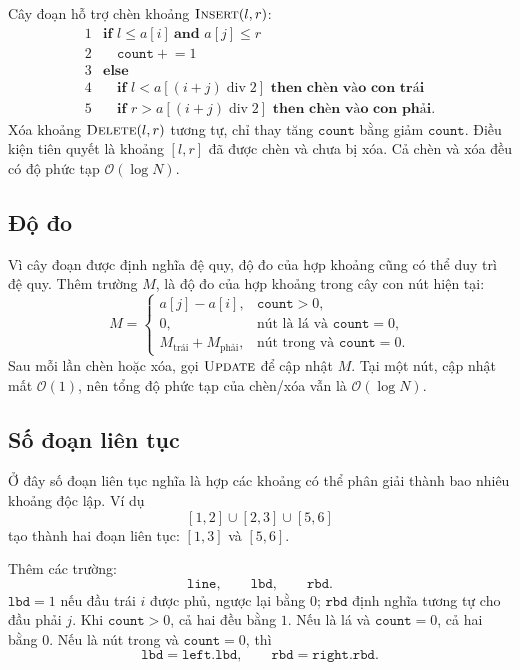 \documentclass[11pt]{article}
\newcommand{\Oh}{\mathcal{O}}
\begin{document}
Cây đoạn hỗ trợ chèn khoảng \(\textsc{Insert}(l,r)\):
\[
\begin{array}{ll}
1 & \textbf{if } l\le a[i]\ \textbf{and } a[j]\le r\\
2 & \quad \texttt{count}\mathrel{+}=1\\
3 & \textbf{else}\\
4 & \quad \textbf{if } l<a[(i+j)\operatorname{div}2] \textbf{ then chèn vào con trái}\\
5 & \quad \textbf{if } r>a[(i+j)\operatorname{div}2] \textbf{ then chèn vào con phải}.
\end{array}
\]
Xóa khoảng \(\textsc{Delete}(l,r)\) tương tự, chỉ thay tăng
\(\texttt{count}\) bằng giảm \(\texttt{count}\). Điều kiện tiên quyết là khoảng
\([l,r]\) đã được chèn và chưa bị xóa. Cả chèn và xóa đều có độ phức tạp
\(\Oh(\log N)\).

\subsection{Độ đo}

Vì cây đoạn được định nghĩa đệ quy, độ đo của hợp khoảng cũng có thể duy trì
đệ quy. Thêm trường \(M\), là độ đo của hợp khoảng trong cây con nút hiện tại:
\[
M=
\begin{cases}
a[j]-a[i], & \texttt{count}>0,\\
0, & \text{nút là lá và }\texttt{count}=0,\\
M_{\text{trái}}+M_{\text{phải}}, & \text{nút trong và }\texttt{count}=0.
\end{cases}
\]
Sau mỗi lần chèn hoặc xóa, gọi \(\textsc{Update}\) để cập nhật \(M\). Tại một
nút, cập nhật mất \(\Oh(1)\), nên tổng độ phức tạp của chèn/xóa vẫn là
\(\Oh(\log N)\).

\subsection{Số đoạn liên tục}

Ở đây số đoạn liên tục nghĩa là hợp các khoảng có thể phân giải thành bao
nhiêu khoảng độc lập. Ví dụ
\[
  [1,2]\cup[2,3]\cup[5,6]
\]
tạo thành hai đoạn liên tục: \([1,3]\) và \([5,6]\).

Thêm các trường:
\[
\texttt{line},\qquad \texttt{lbd},\qquad \texttt{rbd}.
\]
\(\texttt{lbd}=1\) nếu đầu trái \(i\) được phủ, ngược lại bằng \(0\);
\(\texttt{rbd}\) định nghĩa tương tự cho đầu phải \(j\). Khi \(\texttt{count}>0\),
cả hai đều bằng \(1\). Nếu là lá và \(\texttt{count}=0\), cả hai bằng \(0\).
Nếu là nút trong và \(\texttt{count}=0\), thì
\[
  \texttt{lbd}=\texttt{left.lbd},\qquad
  \texttt{rbd}=\texttt{right.rbd}.
\]
\end{document}
